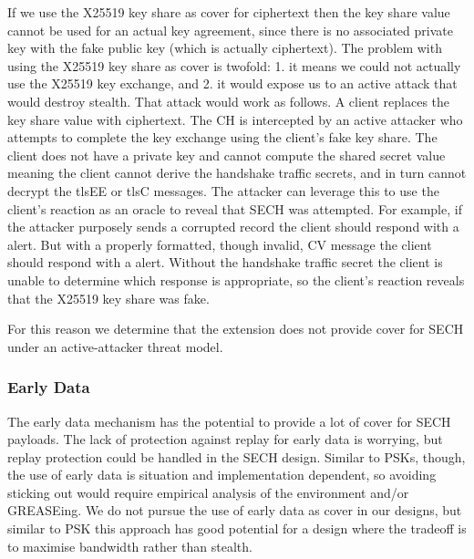 If we use the \ac{X25519} key share as cover for ciphertext
then the key share value cannot be used for an actual key agreement,
since there is no associated private key with the fake public key (which is
actually ciphertext).
The problem with using the \ac{X25519} key share as cover is twofold:
1. it means we could not actually use the \ac{X25519} key exchange, and 2. it would expose us to an active attack that would destroy stealth.
That attack would work as follows. A client replaces the key share
value with ciphertext. The \ac{CH} is intercepted by an active attacker
who attempts to complete the key exchange using the client's fake key share.
The client does not have a private key and cannot compute the shared secret value
meaning the client cannot derive the handshake traffic secrets,
and in turn cannot decrypt the \ac{tlsEE} or \ac{tlsC} messages.
The attacker can leverage this to use the client's reaction as an oracle
to reveal that \ac{SECH} was attempted.
For example, if the attacker purposely sends a corrupted record the client should respond
with a  alert.
But with a properly formatted,
though invalid, \ac{CV} message the client
should respond with a  alert.
Without the handshake traffic secret the client is unable to determine
which response is appropriate,
so the client's reaction reveals that
the \ac{X25519} key share was fake.

For this reason we determine that the  extension does
not provide cover for \ac{SECH} under an active-attacker threat model.

\subsubsection{Early Data}
The early data mechanism has the potential to provide a lot of
cover for \ac{SECH} payloads.
The lack of protection against replay for early data is worrying,
but replay protection could be handled in the \ac{SECH} design.
Similar to \acp{PSK}, though, the use of early data is situation and
implementation dependent,
so avoiding sticking out would require empirical analysis of the environment
and/or \ac{GREASE}ing.
We do not pursue the use of early data as cover in our designs,
but similar to \ac{PSK} this approach has good potential
for a design where the tradeoff is to maximise bandwidth rather than stealth.

